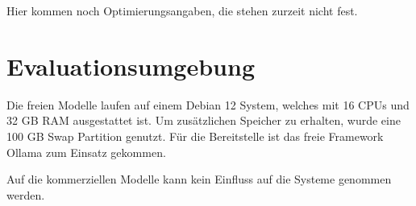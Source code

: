 \begin{tcolorbox}[
	enhanced,
	colback=red!5!white,
	colframe=red!75!black!50,
	title= Mein roter Faden
	]
	Hier kommen noch Optimierungsangaben, die stehen zurzeit nicht fest.
\end{tcolorbox}






\section{Evaluationsumgebung}
Die freien Modelle laufen auf einem Debian 12 System, welches mit 16 CPUs und 32 GB RAM ausgestattet ist. Um zusätzlichen Speicher zu erhalten, wurde eine 100 GB Swap Partition genutzt. Für die Bereitstelle ist das freie Framework Ollama zum Einsatz gekommen.\vspace{0.2cm}

Auf die kommerziellen Modelle kann kein Einfluss auf die Systeme genommen werden.


